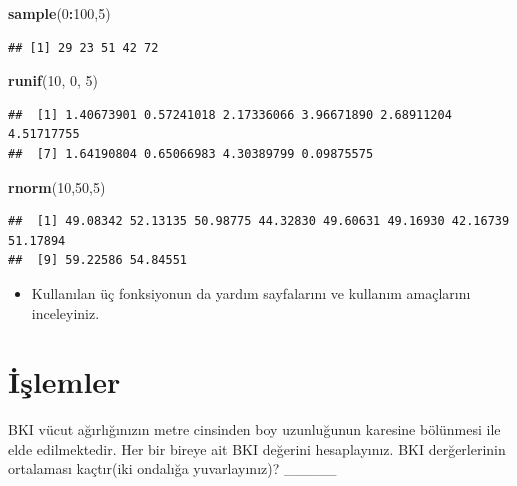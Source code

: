 \documentclass[
  oneside]{book}
\newenvironment{Shaded}{\begin{snugshade}}{\end{snugshade}}
\newcommand{\DecValTok}[1]{\textcolor[rgb]{0.00,0.00,0.81}{#1}}
\newcommand{\FunctionTok}[1]{\textcolor[rgb]{0.13,0.29,0.53}{\textbf{#1}}}
\newcommand{\NormalTok}[1]{#1}
\newcommand{\SpecialCharTok}[1]{\textcolor[rgb]{0.81,0.36,0.00}{\textbf{#1}}}
\providecommand{\tightlist}{%
  \setlength{\itemsep}{0pt}\setlength{\parskip}{0pt}}
\begin{document}
\begin{Shaded}
\begin{Highlighting}[]
\FunctionTok{sample}\NormalTok{(}\DecValTok{0}\SpecialCharTok{:}\DecValTok{100}\NormalTok{,}\DecValTok{5}\NormalTok{)}
\end{Highlighting}
\end{Shaded}

\begin{verbatim}
## [1] 29 23 51 42 72
\end{verbatim}

\begin{Shaded}
\begin{Highlighting}[]
\FunctionTok{runif}\NormalTok{(}\DecValTok{10}\NormalTok{,  }\DecValTok{0}\NormalTok{, }\DecValTok{5}\NormalTok{)}
\end{Highlighting}
\end{Shaded}

\begin{verbatim}
##  [1] 1.40673901 0.57241018 2.17336066 3.96671890 2.68911204 4.51717755
##  [7] 1.64190804 0.65066983 4.30389799 0.09875575
\end{verbatim}

\begin{Shaded}
\begin{Highlighting}[]
\FunctionTok{rnorm}\NormalTok{(}\DecValTok{10}\NormalTok{,}\DecValTok{50}\NormalTok{,}\DecValTok{5}\NormalTok{)}
\end{Highlighting}
\end{Shaded}

\begin{verbatim}
##  [1] 49.08342 52.13135 50.98775 44.32830 49.60631 49.16930 42.16739 51.17894
##  [9] 59.22586 54.84551
\end{verbatim}

\begin{itemize}
\tightlist
\item
  Kullanılan üç fonksiyonun da yardım sayfalarını ve kullanım amaçlarını inceleyiniz.
\end{itemize}

\hypertarget{iux15flemler-1}{%
\section{İşlemler}\label{iux15flemler-1}}

BKI vücut ağırlığınızın metre cinsinden boy uzunluğunun karesine bölünmesi ile elde edilmektedir. Her bir bireye ait BKI değerini hesaplayınız. BKI derğerlerinin ortalaması kaçtır(iki ondalığa yuvarlayınız)? \_\_\_\_\_
\end{document}
